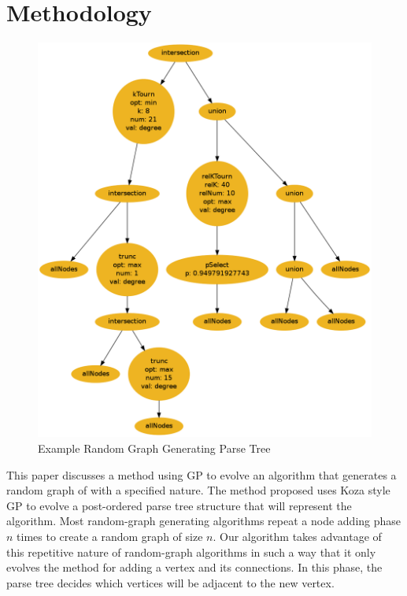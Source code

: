 \documentclass{article}
\begin{document}
\section{Methodology}

\begin{figure}
\begin{centering}
  \includegraphics[scale=0.4]{RandomGraphExample2.png}
  \caption{Example Random Graph Generating Parse Tree}
  \label{fig:example}
\end{centering}
\end{figure}


This paper discusses a method using GP to evolve an algorithm that generates a random graph 
of with a specified nature.  The method proposed uses Koza style GP to evolve a post-ordered 
parse tree structure that will represent the algorithm. Most random-graph generating algorithms 
repeat a node adding phase $n$ times to create a random graph of size $n$. Our algorithm takes 
advantage of this repetitive nature of random-graph algorithms in such a way that it only 
evolves the method for adding a vertex and its connections. In this phase, the parse tree decides 
which vertices will be adjacent to the new vertex.
\end{document}
